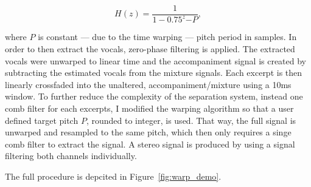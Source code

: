 \begin{equation}
  H(z) = \frac{1}{1 - 0.75^z{-P}},
\end{equation}

where \(P\) is constant --- due to the time warping --- pitch period in samples.
In order to then extract the vocals, zero-phase filtering is applied.
The extracted vocals were unwarped to linear time and the accompaniment signal is created by subtracting the estimated vocals from the mixture signals.
Each excerpt is then linearly crossfaded into the unaltered, accompaniment/mixture using a 10ms window.
To further reduce the complexity of the separation system, instead one comb filter for each excerpts, I modified the warping algorithm so that a user defined target pitch \(P\), rounded to integer, is used.
That way, the full signal is unwarped and resampled to the same pitch, which then only requires a singe comb filter to extract the signal.
A stereo signal is produced by using a signal filtering both channels individually.

The full procedure is depcited in Figure~\ref{fig:warp_demo}.

